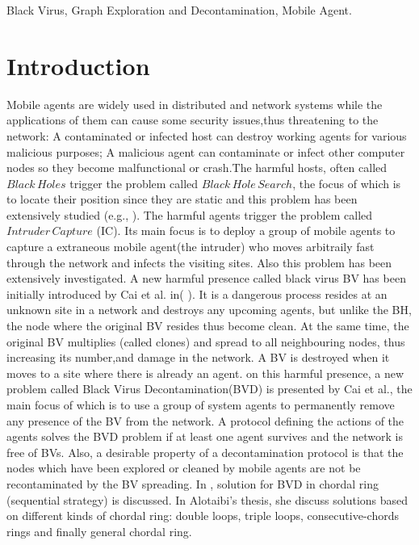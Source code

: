 \documentclass[conference]{IEEEtran}
\begin{document}
\begin{IEEEkeywords}
Black Virus, Graph Exploration and Decontamination, Mobile Agent.
\end{IEEEkeywords}

\section{Introduction}
Mobile agents are widely used in distributed and network systems while the applications of them can cause some security issues,thus threatening to the network: A contaminated or infected host can destroy working agents for various malicious purposes; A malicious agent can contaminate or infect other computer nodes so they become malfunctional or crash.The harmful hosts, often called $Black\,Holes$ trigger the problem called $Black\,Hole\,Search$, the focus of which is to locate their position since they are static and this problem has been extensively studied (e.g.,          ). The harmful agents trigger the problem called $Intruder\,Capture$ (IC). Its main focus is to deploy a group of mobile agents to capture a extraneous mobile agent(the intruder) who moves arbitraily fast through the network and infects the visiting sites. Also this problem has been extensively investigated.
A new harmful presence called black virus BV has been initially introduced by Cai et al. in(               ). It is a dangerous process resides at an unknown site in a network and destroys any upcoming agents, but unlike the BH, the node where the original BV resides thus become clean. At the same time, the original BV multiplies (called clones) and spread to all neighbouring nodes, thus increasing its number,and damage in the network. A BV is destroyed when it moves to a site where there is already an agent. on this harmful presence, a new problem called Black Virus Decontamination(BVD) is presented by Cai et al., the main focus of which is to use a group of system agents to permanently remove any presence of the BV from the network. A protocol defining the actions of the agents solves the BVD problem if at least one agent survives and the network is free of BVs. Also, a desirable property of a decontamination protocol is that the nodes which have been explored or cleaned by mobile agents are not be recontaminated by the BV spreading. In \cite{Alotaibi}, solution for BVD in chordal ring (sequential strategy) is discussed. In Alotaibi's thesis, she discuss solutions based on different kinds of chordal ring: double loops, triple loops, consecutive-chords rings and finally general chordal ring. \\
\end{document}
